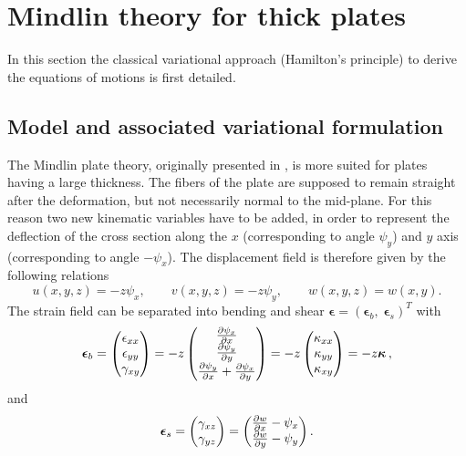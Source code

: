 \documentclass[preprint,12pt]{elsarticle}
\begin{document}
\section{Mindlin theory for thick plates}
In this section the classical variational approach (Hamilton's principle) to derive the equations of motions is first detailed. 
\subsection{Model and associated variational formulation}
\label{sec:Min_Var}
The Mindlin plate theory, originally presented in \cite{mindlin}, is more suited for plates having a large thickness. The fibers of the plate are supposed to remain straight after the deformation, but not necessarily normal to the mid-plane. For this reason two new kinematic variables have to be added, in order to represent the deflection of the cross section along the $x$ (corresponding to angle $\psi_y$) and $y$ axis (corresponding to angle $-\psi_x$). The displacement field is therefore given by the following relations
\begin{equation}
u(x,y,z) = -z \psi_x, \qquad v(x,y,z) = -z \psi_y, \qquad 
w(x,y,z) = w(x,y).
\end{equation}
The strain field can be separated into bending and shear $\bm{\epsilon} = \left(\bm{\epsilon}_b, \; \bm{\epsilon}_s \right)^T$ with
\begin{equation}
\bm{\epsilon}_b = 
\begin{pmatrix}
\epsilon_{xx} \\
\epsilon_{yy} \\
\gamma_{xy} \\
\end{pmatrix} = -z
\begin{pmatrix}
\diffp{\psi_x}{x} \\
\diffp{\psi_y}{y} \\
\diffp{\psi_y}{x} + \diffp{\psi_x}{y} \\
\end{pmatrix} = -z
\begin{pmatrix}
\kappa_{xx} \\
\kappa_{yy} \\
\kappa_{xy} \\
\end{pmatrix} = -z \bm{\kappa}\,,
\end{equation}
and
\begin{equation}	
\bm{\epsilon}_s = 
\begin{pmatrix}
\gamma_{xz} \\
\gamma_{yz} \\
\end{pmatrix} = 
\begin{pmatrix}
\diffp{w}{x} - \psi_x \\
\diffp{w}{y} - \psi_y \\
\end{pmatrix}.
\end{equation}
\end{document}
